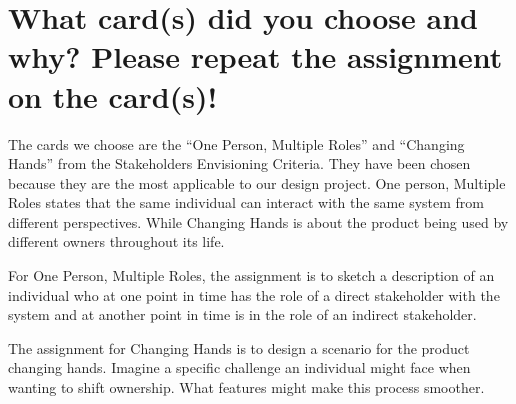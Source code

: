 \section{What card(s) did you choose and why? Please repeat the assignment on the card(s)!}

The cards we choose are the ``One Person, Multiple Roles'' and ``Changing Hands'' from the Stakeholders Envisioning Criteria. They have been chosen because they are the most applicable to our design project. One person, Multiple Roles states that the same individual can interact with the same system from different perspectives. While Changing Hands is about the product being used by different owners throughout its life. 

For One Person, Multiple Roles, the assignment is to sketch a description of an individual who at one point in time has the role of a direct stakeholder with the system and at another point in time is in the role of an indirect stakeholder. 

The assignment for Changing Hands is to design a scenario for the product changing hands. Imagine a specific challenge an individual might face when wanting to shift ownership. What features might make this process smoother. 
